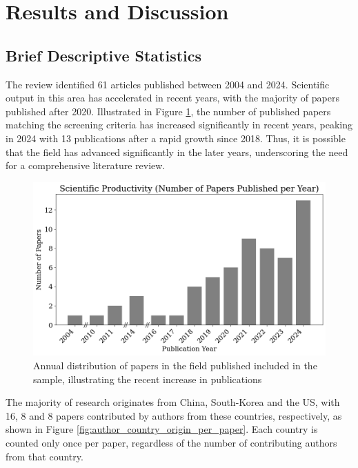 \section{Results and Discussion}
\label{sec:result_and_discussion}


\subsection{Brief Descriptive Statistics}
The review identified 61 articles published between 2004 and 2024. Scientific output in this area has accelerated in recent years, with the majority of papers published after 2020. Illustrated in Figure \ref{fig:scientific_productivity}, the number of published papers matching the screening criteria has increased significantly in recent years, peaking in 2024 with 13 publications after a rapid growth since 2018. Thus, it is possible that the field has advanced significantly in the later years, underscoring the need for a comprehensive literature review.

\begin{figure}[H]
    \centering
    \includegraphics[width=1\linewidth]{Images/scientific_productivity.png}
    \caption{Annual distribution of papers in the field published included in the sample, illustrating the recent increase in publications}
    \label{fig:scientific_productivity}
\end{figure}

The majority of research originates from China, South-Korea and the US, with 16, 8 and 8 papers contributed by authors from these countries, respectively, as shown in Figure \ref{fig:author_country_origin_per_paper}. Each country is counted only once per paper, regardless of the number of contributing authors from that country.  

